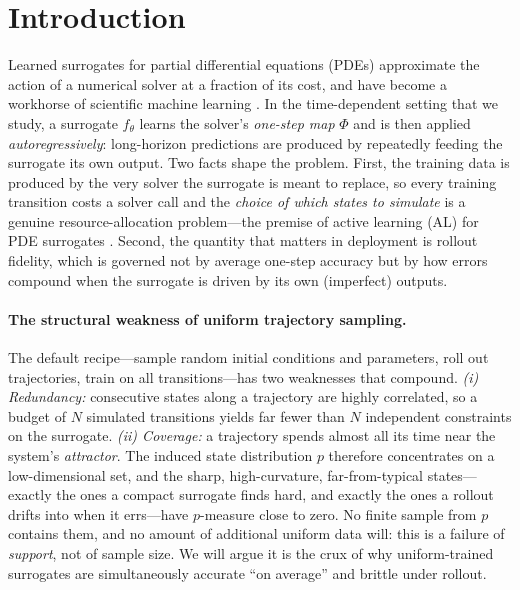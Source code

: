 \documentclass{article}
\theoremstyle{plain}
\theoremstyle{definition}
\theoremstyle{remark}
\newcommand{\sol}{\Phi}
\newcommand{\surr}{f_\theta}
\newcommand{\pnat}{p}
\begin{document}
\section{Introduction}\label{sec:intro}
Learned surrogates for partial differential equations (PDEs) approximate the action of a numerical
solver at a fraction of its cost, and have become a workhorse of scientific machine learning
\citep{li2021fno,lu2021deeponet,brandstetter2022mppde,takamoto2022pdebench}. In the time-dependent
setting that we study, a surrogate $\surr$ learns the solver's \emph{one-step map} $\sol$ and is then
applied \emph{autoregressively}: long-horizon predictions are produced by repeatedly feeding the
surrogate its own output. Two facts shape the problem. First, the training data is produced by the very
solver the surrogate is meant to replace, so every training transition costs a solver call and the
\emph{choice of which states to simulate} is a genuine resource-allocation problem---the premise of
active learning (AL) for PDE surrogates \citep{musekamp2024al4pde,settles2009active}. Second, the
quantity that matters in deployment is rollout fidelity, which is governed not by average one-step
accuracy but by how errors compound when the surrogate is driven by its own (imperfect) outputs.

\paragraph{The structural weakness of uniform trajectory sampling.}
The default recipe---sample random initial conditions and parameters, roll out trajectories, train on
all transitions---has two weaknesses that compound. \emph{(i) Redundancy:} consecutive states along a
trajectory are highly correlated, so a budget of $N$ simulated transitions yields far fewer than $N$
independent constraints on the surrogate. \emph{(ii) Coverage:} a trajectory spends almost all its time
near the system's \emph{attractor}. The induced state distribution $\pnat$ therefore concentrates on a
low-dimensional set, and the sharp, high-curvature, far-from-typical states---exactly the ones a compact
surrogate finds hard, and exactly the ones a rollout drifts into when it errs---have $\pnat$-measure
close to zero. No finite sample from $\pnat$ contains them, and no amount of additional uniform data
will: this is a failure of \emph{support}, not of sample size. We will argue it is the crux of why
uniform-trained surrogates are simultaneously accurate ``on average'' and brittle under rollout.
\end{document}
